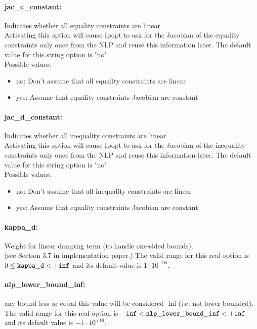 \paragraph{jac\_c\_constant:}\label{opt:jac_c_constant} Indicates whether all equality constraints are linear \\
 Activating this option will cause Ipopt to ask for the Jacobian of the equality constraints only once from the NLP and reuse this information later. The default value for this string option is "no".
\\ 
Possible values:
\begin{itemize}
   \item no: Don't assume that all equality constraints are linear
   \item yes: Assume that equality constraints Jacobian are constant
\end{itemize}

\paragraph{jac\_d\_constant:}\label{opt:jac_d_constant} Indicates whether all inequality constraints are linear \\
 Activating this option will cause Ipopt to ask for the Jacobian of the inequality constraints only once from the NLP and reuse this information later. The default value for this string option is "no".
\\ 
Possible values:
\begin{itemize}
   \item no: Don't assume that all inequality constraints are linear
   \item yes: Assume that equality constraints Jacobian are constant
\end{itemize}

\paragraph{kappa\_d:}\label{opt:kappa_d} Weight for linear damping term (to handle one-sided bounds). \\
 (see Section 3.7 in implementation paper.) The valid range for this real option is 
$0 \le {\tt kappa\_d } <  {\tt +inf}$
and its default value is $1 \cdot 10^{-05}$.


\paragraph{nlp\_lower\_bound\_inf:}\label{opt:nlp_lower_bound_inf} any bound less or equal this value will be considered -inf (i.e. not lower bounded). \\
 The valid range for this real option is 
${\tt -inf} <  {\tt nlp\_lower\_bound\_inf } <  {\tt +inf}$
and its default value is $-1 \cdot 10^{+19}$.


